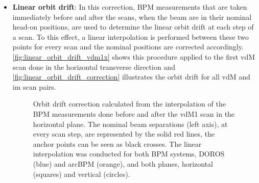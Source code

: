 \begin{itemize}
	\item \textbf{Linear orbit drift}: In this correction, BPM measurements that are taken immediately before and after the scans, when the beam are in their nominal head-on positions, are used to determine the linear orbit drift at each step of a scan. To this effect, a linear interpolation is performed between these two points for every scan and the nominal positions are corrected accordingly. \autoref{fig:linear_orbit_drift_vdm1x} shows this procedure applied to the first vdM scan done in the horizontal transverse direction and \autoref{fig:linear_orbit_drift_correction} illustrates the orbit drift for all vdM and im scan pairs.

	\begin{figure}[!htb]
		\centering
		\caption[Orbit drift correction calculation]{Orbit drift correction calculated from the interpolation of the BPM measurements done before and after the vdM1 scan in the horizontal plane. The nominal beam separations (left axis), at every scan step, are represented by the solid red lines, the anchor points can be seen as black crosses. The linear interpolation was conducted for both BPM systems, DOROS (blue) and arcBPM (orange), and both planes, horizontal (squares) and vertical (circles).}
		\label{fig:linear_orbit_drift_vdm1x}
	\end{figure}


\end{itemize}
